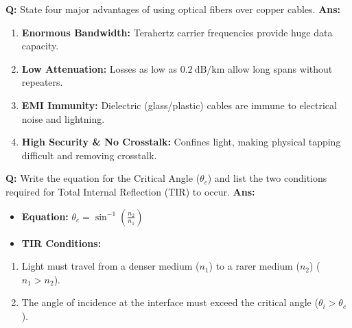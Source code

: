 \documentclass[10pt,a4paper,twocolumn]{article}
\begin{document}
\begin{tcolorbox}[
  colback=white,
  colframe=UnitColorOne,
  colbacktitle=gray!10!white,
  coltitle=black,
  fonttitle=\bfseries\sffamily\small,
  title={Unit I $\bullet$ Card 2: Advantages of Optical Fibers},
  boxrule=1.2pt,
  arc=2mm,
  outer arc=2mm,
  boxsep=1.5mm,
  top=1mm,
  bottom=1mm,
  left=1.5mm,
  right=1.5mm,
  before skip=2.5mm,
  after skip=2.5mm
]
\textbf{Q:} State four major advantages of using optical fibers over copper cables.
\tcbline
\textbf{Ans:} \begin{enumerate}
  \item \textbf{Enormous Bandwidth:} Terahertz carrier frequencies provide huge data capacity.
  \item \textbf{Low Attenuation:} Losses as low as $0.2\ \text{dB/km}$ allow long spans without repeaters.
  \item \textbf{EMI Immunity:} Dielectric (glass/plastic) cables are immune to electrical noise and lightning.
  \item \textbf{High Security \& No Crosstalk:} Confines light, making physical tapping difficult and removing crosstalk.
\end{enumerate}
\end{tcolorbox}


\begin{tcolorbox}[
  colback=white,
  colframe=UnitColorOne,
  colbacktitle=gray!10!white,
  coltitle=black,
  fonttitle=\bfseries\sffamily\small,
  title={Unit I $\bullet$ Card 3: Critical Angle and TIR},
  boxrule=1.2pt,
  arc=2mm,
  outer arc=2mm,
  boxsep=1.5mm,
  top=1mm,
  bottom=1mm,
  left=1.5mm,
  right=1.5mm,
  before skip=2.5mm,
  after skip=2.5mm
]
\textbf{Q:} Write the equation for the Critical Angle ($\theta_c$) and list the two conditions required for Total Internal Reflection (TIR) to occur.
\tcbline
\textbf{Ans:} \begin{itemize}
  \item   \textbf{Equation:} $\theta_c = \sin^{-1}\left(\frac{n_2}{n_1}\right)$
  \item   \textbf{TIR Conditions:}
\end{itemize}
\begin{enumerate}
  \item Light must travel from a denser medium ($n_1$) to a rarer medium ($n_2$) ($n_1 > n_2$).
  \item The angle of incidence at the interface must exceed the critical angle ($\theta_i > \theta_c$).
\end{enumerate}
\end{tcolorbox}
\end{document}
